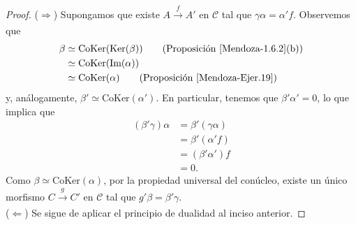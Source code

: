 \documentclass[tesis]{subfiles}
\begin{document}
\begin{proof}

    ($\Rightarrow$) Supongamos que existe $A\xrightarrow[]{f}A'$ en $\mathscr{C}$ tal que $\gamma\alpha = \alpha'f$. Observemos que
    \begin{align*}
        \beta &\simeq \text{CoKer}(\text{Ker}(\beta)) \tag{Proposición \ref{Mendoza-1.6.2}(b)} \\
        &\simeq \text{CoKer}(\text{Im}(\alpha)) \\
        &\simeq \text{CoKer}(\alpha) \tag{Proposición \ref{Mendoza-Ejer.19}}
    \end{align*}
    y, análogamente, $\beta'\simeq \text{CoKer}(\alpha')$. En particular, tenemos que $\beta'\alpha'=0$, lo que implica que
    \begin{align*}
        (\beta'\gamma)\alpha &= \beta'(\gamma\alpha) \\
                             &= \beta'(\alpha' f) \\
                             &= (\beta'\alpha')f \\
                             &= 0.
    \end{align*}
    Como $\beta\simeq\text{CoKer}(\alpha)$, por la propiedad universal del conúcleo, existe un único morfismo $C\xrightarrow[]{g}C'$ en $\mathscr{C}$ tal que $g'\beta = \beta'\gamma$. \\

    ($\Leftarrow$) Se sigue de aplicar el principio de dualidad al inciso anterior.
\end{proof}
\end{document}

